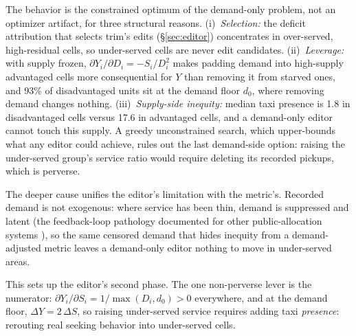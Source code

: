 The behavior is the constrained optimum of the demand-only problem, not an
optimizer artifact, for three structural reasons. (i)~\emph{Selection:} the
deficit attribution that selects trim's edits (\S\ref{sec:editor}) concentrates
in over-served, high-residual cells, so under-served cells are never edit
candidates. (ii)~\emph{Leverage:} with supply frozen,
$\partial Y_i / \partial D_i = -S_i / D_i^{2}$ makes padding demand into
high-supply advantaged cells more consequential for $Y$
than removing it from starved ones, and 93\% of disadvantaged units sit at
the demand floor $d_0$, where removing demand changes nothing.
(iii)~\emph{Supply-side inequity:} median taxi presence is 1.8 in disadvantaged
cells versus 17.6 in advantaged cells, and a demand-only editor cannot touch this supply.
A greedy unconstrained search, which upper-bounds what any editor could
achieve, rules out the last demand-side option: raising the under-served
group's service ratio would require deleting its recorded pickups, which is
perverse.

The deeper cause unifies the editor's limitation with the metric's. Recorded
demand is not exogenous: where service has been thin, demand is suppressed and
latent (the feedback-loop pathology documented for other public-allocation
systems \cite{ensign2018,lumisaac2016}), so the same censored demand that
hides inequity from a demand-adjusted metric leaves a demand-only editor
nothing to move in under-served areas.

This sets up the editor's second phase. The one non-perverse lever is the
numerator: $\partial Y_i / \partial S_i = 1 / \max(D_i, d_0) > 0$ everywhere,
and at the demand floor, $\Delta Y = 2\,\Delta S$, so raising under-served
service requires adding taxi \emph{presence}: rerouting real seeking
behavior into under-served cells.

